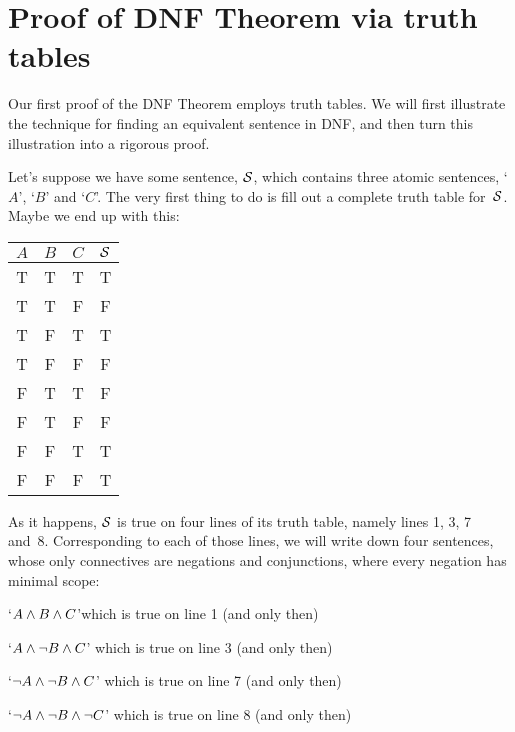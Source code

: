 \section{Proof of DNF Theorem via truth tables}
\label{s:DNFTruthTable}

Our first proof of the DNF Theorem employs truth tables. We will first illustrate the technique for finding an equivalent sentence in DNF, and then turn this illustration into a rigorous proof.

Let's suppose we have some sentence, $\mathcal{S}$, which contains three atomic sentences, `$A$', `$B$' and `$C$'. The very first thing to do is fill out a complete truth table for~$\mathcal{S}$. Maybe we end up with this:
\begin{center}
\begin{tabular}{c c c | c}
$A$ & $B$ & $C$ & $\mathcal{S}$\\
\hline
 T & T & T & T \\
 T & T & F & F \\
 T & F & T & T \\
 T & F & F & F \\
 F & T & T & F \\
 F & T & F & F \\
 F & F & T & T \\
 F & F & F & T
\end{tabular}
\end{center}
%
%
As it happens, $\mathcal{S}$ is true on four lines of its truth table, namely lines 1, 3, 7 and~8. Corresponding to each of those lines, we will write down four sentences, whose only connectives are negations and conjunctions, where every negation has minimal scope:
	\begin{compactlist}
		\item  `$A \wedge B \wedge C$'\hfill which is true on line 1 (and only then)
		\item `$A \wedge \neg B \wedge C$' \hfill which is true on line 3 (and only then)
		\item `$\neg A \wedge \neg B \wedge C$' \hfill which is true on line 7 (and only then)
		\item `$\neg A \wedge \neg B \wedge \neg C$' \hfill which is true on line 8 (and only then)
	\end{compactlist}
